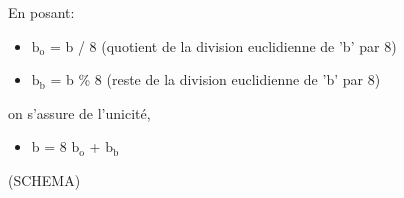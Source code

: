 \documentclass[a4paper,10pt]{article}
\begin{document}
    En posant:
    \begin{itemize}[label=-]
      \item $\textrm{b}_\textrm{o}$ = b / 8 (quotient de la division euclidienne de 'b' par 8)
      \item $\textrm{b}_\textrm{b}$ = b \% 8 (reste de la division euclidienne de 'b' par 8)
    \end{itemize}
    on s'assure de l'unicité,
    \begin{itemize}[label=-]
      \item b = 8 $\textrm{b}_\textrm{o}$ + $\textrm{b}_\textrm{b}$
    \end{itemize}
    
    (SCHEMA)\newline\newline
    
\end{document}
